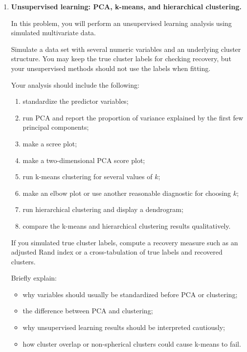\documentclass[11pt]{article}
\begin{document}
\begin{enumerate}
Briefly explain the difference between bootstrap resampling and permutation testing. Your explanation should clearly state what exchangeability means and when a permutation test is appropriate.

\newpage

\item \textbf{Unsupervised learning: PCA, k-means, and hierarchical clustering.}

In this problem, you will perform an unsupervised learning analysis using simulated multivariate data.

Simulate a data set with several numeric variables and an underlying cluster structure. You may keep the true cluster labels for checking recovery, but your unsupervised methods should not use the labels when fitting.

Your analysis should include the following:

\begin{enumerate}[label=(\alph*)]
    \item standardize the predictor variables;
    \item run PCA and report the proportion of variance explained by the first few principal components;
    \item make a scree plot;
    \item make a two-dimensional PCA score plot;
    \item run k-means clustering for several values of \(k\);
    \item make an elbow plot or use another reasonable diagnostic for choosing \(k\);
    \item run hierarchical clustering and display a dendrogram;
    \item compare the k-means and hierarchical clustering results qualitatively.
\end{enumerate}

If you simulated true cluster labels, compute a recovery measure such as an adjusted Rand index or a cross-tabulation of true labels and recovered clusters.

Briefly explain:

\begin{itemize}
    \item why variables should usually be standardized before PCA or clustering;
    \item the difference between PCA and clustering;
    \item why unsupervised learning results should be interpreted cautiously;
    \item how cluster overlap or non-spherical clusters could cause k-means to fail.
\end{itemize}

\end{enumerate}
\end{document}

